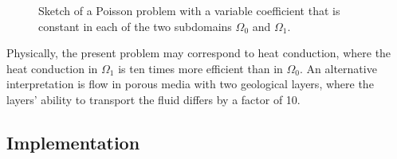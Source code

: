 \begin{figure}[!b]
 \caption{Sketch of a Poisson problem with a variable coefficient that
 is constant in each of the two subdomains $\Omega_0$ and $\Omega_1$.}
\label{langtangen:possion:2D:2mat:fig1}
\end{figure}

Physically, the present problem may correspond to heat conduction, where
the heat conduction in $\Omega_1$ is ten times more efficient than in
$\Omega_0$. An alternative interpretation is flow in porous media with
two geological layers, where the layers' ability to transport the fluid
differs by a factor of 10.

\subsection{Implementation}
\label{langtangen:possion:2D:2mat:impl}

